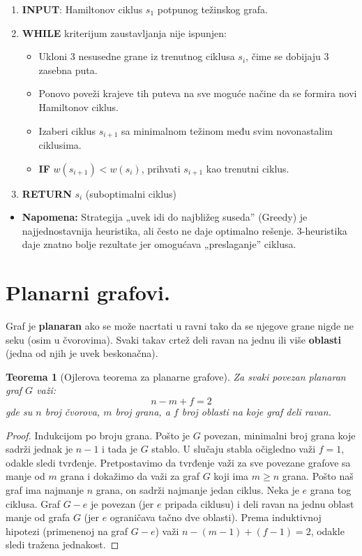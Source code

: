 \documentclass[a4paper,12pt]{article}
\numberwithin{algorithm}{section}
\theoremstyle{plain}
\newtheorem{theorem}{Teorema}[section]
\theoremstyle{definition}
\theoremstyle{remark}
\begin{document}
\begin{algorithm}[!h]
    \caption{3-heuristika za TSP}
    \begin{enumerate}
        \item \textbf{INPUT}: Hamiltonov ciklus $s_1$ potpunog težinskog grafa.
        \item \textbf{WHILE} kriterijum zaustavljanja nije ispunjen:
        \begin{itemize}
            \item Ukloni 3 nesusedne grane iz trenutnog ciklusa $s_i$, čime se dobijaju 3 zasebna puta.
            \item Ponovo poveži krajeve tih puteva na sve moguće načine da se formira novi Hamiltonov ciklus.
            \item Izaberi ciklus $s_{i+1}$ sa minimalnom težinom među svim novonastalim ciklusima.
            \item \textbf{IF} $w(s_{i+1}) < w(s_i)$, prihvati $s_{i+1}$ kao trenutni ciklus.
        \end{itemize}
        \item \textbf{RETURN} $s_i$ (suboptimalni ciklus)
    \end{enumerate}
\end{algorithm}

\begin{itemize}
    \item \textbf{Napomena:} Strategija „uvek idi do najbližeg suseda” (Greedy) je najjednostavnija heuristika, ali često ne daje optimalno rešenje. 3-heuristika daje znatno bolje rezultate jer omogućava „preslaganje” ciklusa.
\end{itemize}
\newpage
\section{Planarni grafovi.}

Graf je \textbf{planaran} ako se može nacrtati u ravni tako da se njegove grane nigde ne seku (osim u čvorovima). Svaki takav crtež deli ravan na jednu ili više \textbf{oblasti} (jedna od njih je uvek beskonačna).
\begin{theorem}[Ojlerova teorema za planarne grafove]
    Za svaki povezan planaran graf $G$ važi:
    $$n - m + f = 2$$
    gde su $n$ broj čvorova, $m$ broj grana, a $f$ broj oblasti na koje graf deli ravan.
\end{theorem}
\begin{proof}
    Indukcijom po broju grana. Pošto je $G$ povezan, minimalni broj grana koje sadrži jednak je $n - 1$ i tada je $G$ stablo. U slučaju stabla očigledno važi $f = 1$, odakle sledi tvrđenje. Pretpostavimo da tvrđenje važi za sve povezane grafove sa manje od $m$ grana i dokažimo da važi za graf $G$ koji ima $m \ge n$ grana. Pošto naš graf ima najmanje $n$ grana, on sadrži najmanje jedan ciklus. Neka je $e$ grana tog ciklusa. Graf $G - e$ je povezan (jer $e$ pripada ciklusu) i deli ravan na jednu oblast manje od grafa $G$ (jer $e$ ograničava tačno dve oblasti). Prema induktivnoj hipotezi (primenenoj na graf $G - e$) važi $n - (m - 1) + (f - 1) = 2$, odakle sledi tražena jednakost.
\end{proof}
\end{document}
